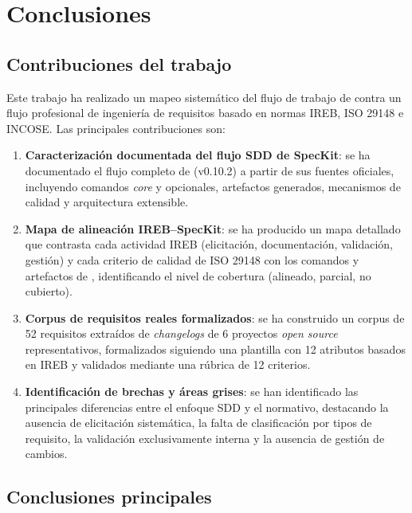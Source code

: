 \section{Conclusiones}
\label{sec:conclusiones}

\subsection{Contribuciones del trabajo}

Este trabajo ha realizado un mapeo sistem\'atico del flujo de trabajo de \speckit{} contra un flujo profesional de ingenier\'ia de requisitos basado en normas IREB, ISO 29148 e INCOSE. Las principales contribuciones son:

\begin{enumerate}
    \item \textbf{Caracterizaci\'on documentada del flujo SDD de SpecKit}: se ha documentado el flujo completo de \speckit{} (v0.10.2) a partir de sus fuentes oficiales, incluyendo comandos \emph{core} y opcionales, artefactos generados, mecanismos de calidad y arquitectura extensible.
    
    \item \textbf{Mapa de alineaci\'on IREB--SpecKit}: se ha producido un mapa detallado que contrasta cada actividad IREB (elicitaci\'on, documentaci\'on, validaci\'on, gesti\'on) y cada criterio de calidad de ISO 29148 con los comandos y artefactos de \speckit{}, identificando el nivel de cobertura (alineado, parcial, no cubierto).
    
    \item \textbf{Corpus de requisitos reales formalizados}: se ha construido un corpus de 52 requisitos extra\'idos de \emph{changelogs} de 6 proyectos \emph{open source} representativos, formalizados siguiendo una plantilla con 12 atributos basados en IREB y validados mediante una r\'ubrica de 12 criterios.
    
    \item \textbf{Identificaci\'on de brechas y \'areas grises}: se han identificado las principales diferencias entre el enfoque SDD y el normativo, destacando la ausencia de elicitaci\'on sistem\'atica, la falta de clasificaci\'on por tipos de requisito, la validaci\'on exclusivamente interna y la ausencia de gesti\'on de cambios.
\end{enumerate}

\subsection{Conclusiones principales}

